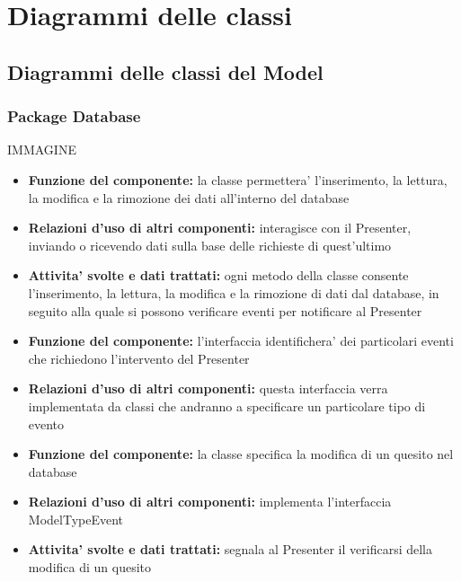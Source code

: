 \documentclass[a4paper,11pt]{article}
\begin{document}
	\section{Diagrammi delle classi}
		\subsection{Diagrammi delle classi del Model}
			\subsubsection{Package Database}
			IMMAGINE
 			\begin{itemize}
		    	\item\textbf{Funzione del componente:} la classe permettera' l'inserimento, la lettura, la modifica e la rimozione dei dati all'interno del database
			\item\textbf{Relazioni d'uso di altri componenti:} interagisce con il Presenter, inviando o ricevendo dati sulla base delle richieste di quest'ultimo
			\item\textbf{Attivita' svolte e dati trattati:} ogni metodo della classe consente l'inserimento, la lettura, la modifica e la rimozione di dati dal database, in seguito alla quale si possono verificare eventi per notificare al Presenter
			\end{itemize}
			\begin{itemize}
		    	\item\textbf{Funzione del componente:} l'interfaccia identifichera' dei particolari eventi che richiedono l'intervento del Presenter
			\item\textbf{Relazioni d'uso di altri componenti:} questa interfaccia verra implementata da classi che andranno a specificare un particolare tipo di evento
			\end{itemize}
			\begin{itemize}
		    	\item\textbf{Funzione del componente:} la classe specifica la modifica di un quesito nel database
				\item\textbf{Relazioni d'uso di altri componenti:} implementa l'interfaccia ModelTypeEvent
				\item\textbf{Attivita' svolte e dati trattati:} segnala al Presenter il verificarsi della modifica di un quesito
			\end{itemize}
\end{document}
